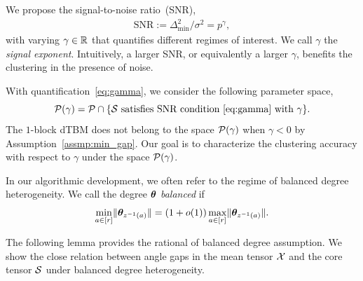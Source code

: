 \documentclass[journal]{IEEEtran}
\theoremstyle{definition}
\theoremstyle{definition}
\begin{document}
We propose the signal-to-noise ratio~(SNR),
\begin{align}\label{eq:gamma}
  \text{SNR}:= \Delta^2_{\min}/\sigma^2 = p^{\gamma}, 
\end{align}
with varying $\gamma \in \mathbb{R}$ that quantifies different regimes of interest. We call $\gamma$ the \emph{signal exponent}. Intuitively, a larger SNR, or equivalently a larger $\gamma$, benefits the clustering in the presence of noise. 

With quantification~\eqref{eq:gamma}, we consider the following parameter space,
\begin{equation}\label{eq:gammafamily}
    \tP(\gamma) = \tP\cap\{\tS \text{ satisfies SNR condition~\eqref{eq:gamma} with $\gamma$} \}.
\end{equation}
The $1$-block dTBM does not belong to the space $\mathcal{P}(\gamma)$ when $\gamma < 0$ by Assumption~\ref{assmp:min_gap}. Our goal is to characterize the clustering accuracy with respect to $\gamma$ under the space $\mathcal{P}(\gamma)$.

In our algorithmic development, we often refer to the regime of balanced degree heterogeneity. We call the degree $\boldsymbol{\theta}$ \emph{balanced} if
\begin{equation}\label{eq:degree}
{\min_{a\in[r]} \onormSize{}{\mtheta_{z^{-1}(a)}}=\left(1+o(1)\right)\max_{a\in[r]}\onormSize{}{\mtheta_{z^{-1}(a)}}}.
\end{equation}

The following lemma provides the rational of balanced degree assumption. We show the close relation between angle gaps in the mean tensor $\mathcal{X}$ and the core tensor $\mathcal{S}$ under balanced degree heterogeneity. 
\end{document}
